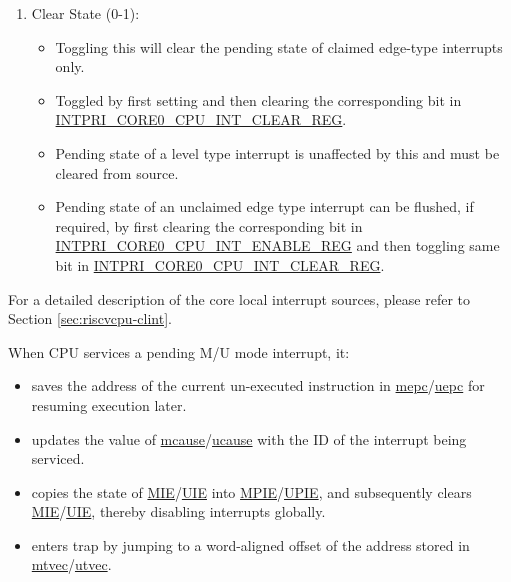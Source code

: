 \documentclass[main\_\_EN.tex]{subfiles}
\begin{document}
\begin{enumerate}
\begin{itemize}
        \item A pending interrupt will cause CPU to enter trap if no other pending interrupt has higher priority.
        \item A pending interrupt is said to be 'claimed' if it preempts the CPU and causes it to jump to the corresponding trap vector address.
        \item All pending interrupts which are yet to be serviced are termed as 'unclaimed'.
    \end{itemize}
    \item Clear State (0-1):
    \begin{itemize}
        \item Toggling this will clear the pending state of claimed edge-type interrupts only.
        \item Toggled by first setting and then clearing the corresponding bit in \hyperref[regdesc:INTPRICORE0CPUINTCLEARREG]{INTPRI\_CORE0\_CPU\_INT\_CLEAR\_REG}.
        \item Pending state of a level type interrupt is unaffected by this and must be cleared from source.
        \item Pending state of an unclaimed edge type interrupt can be flushed, if required, by first clearing the corresponding bit in \hyperref[regdesc:INTPRICORE0CPUINTENABLEREG]{INTPRI\_CORE0\_CPU\_INT\_ENABLE\_REG} and then toggling same bit in \hyperref[regdesc:INTPRICORE0CPUINTCLEARREG]{INTPRI\_CORE0\_CPU\_INT\_CLEAR\_REG}.
    \end{itemize}
\end{enumerate}

For a detailed description of the core local interrupt sources, please refer to Section \ref{sec:riscvcpu-clint}.

When CPU services a pending M/U mode interrupt, it:
\begin{itemize}
    \item saves the address of the current un-executed instruction in \hyperref[regdesc:MEPC]{mepc}/\hyperref[regdesc:UEPC]{uepc} for resuming execution later.
    \item updates the value of \hyperref[regdesc:MCAUSE]{mcause}/\hyperref[regdesc:UCAUSE]{ucause} with the ID of the interrupt being serviced.
    \item copies the state of \hyperref[fielddesc:MSTATUSMIE]{MIE}/\hyperref[fielddesc:USTATUSUIE]{UIE} into \hyperref[fielddesc:MSTATUSMPIE]{MPIE}/\hyperref[fielddesc:USTATUSUPIE]{UPIE}, and subsequently clears \hyperref[fielddesc:MSTATUSMIE]{MIE}/\hyperref[fielddesc:USTATUSUIE]{UIE}, thereby disabling interrupts globally.
    \item enters trap by jumping to a word-aligned offset of the address stored in \hyperref[regdesc:MTVEC]{mtvec}/\hyperref[regdesc:UTVEC]{utvec}.
\end{itemize}
\end{document}
